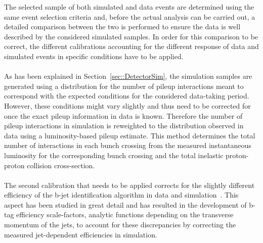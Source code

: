 The selected sample of both simulated and data events are determined using the same event selection criteria and, before the actual analysis can be carried out, a detailed comparison between the two is performed to ensure the data is well described by the considered simulated samples.
In order for this comparison to be correct, the different calibrations accounting for the different response of data and simulated events in specific conditions have to be applied.
\\
\\
As has been explained in Section~\ref{sec::DetectorSim}, the simulation samples are generated using a distribution for the number of pileup interactions meant to correspond with the expected conditions for the considered data-taking period. However, these conditions might vary slightly and thus need to be corrected for once the exact pileup information in data is known.
Therefore the number of pileup interactions in simulation is reweighted to the distribution observed in data using a luminosity-based pileup estimate.
This method determines the total number of interactions in each bunch crossing from the measured instantaneous luminosity for the corresponding bunch crossing and the total inelastic proton-proton collision cross-section.
\\
\\
The second calibration that needs to be applied corrects for the slightly different efficiency of the b-jet identification algorithm in data and simulation~\cite{BTagSF}.
This aspect has been studied in great detail and has resulted in the development of b-tag efficiency scale-factors, analytic functions depending on the transverse momentum of the jets, to account for these discrepancies by correcting the measured jet-dependent efficiencies in simulation.
